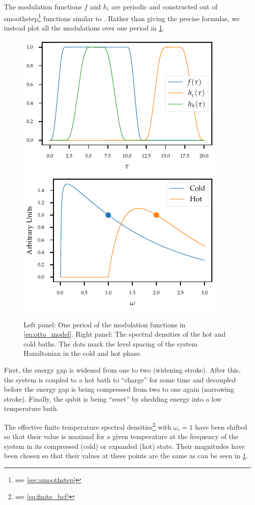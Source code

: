 The modulation functions \(f\) and \(h_{i}\) are periodic and
constructed out of smoothstep\footnote{see \cref{sec:smoothstep}}
functions similar to \cite{Wiedmann2021Jun}.  Rather than giving the precise formulas, we instead plot
all the modulations over one period in \cref{fig:ottomod}.
\begin{figure}[htp]
  \centering
  \includegraphics{figs/otto/modulation}
  \includegraphics{figs/otto/spectral_densities}
  \caption{\label{fig:ottomod} Left panel: One period of the modulation functions
    in \cref{eq:otto_model}. Right panel: The spectral densities of
    the hot and cold baths. The dots mark the level spacing of the
    system Hamiltonian in the cold and hot phase.}
\end{figure}

First, the energy gap is widened from one to two (widening
stroke). After this, the system is coupled to a hot bath to ``charge''
for some time and decoupled before the energy gap is being compressed
from two to one again (narrowing stroke). Finally, the qubit is being
``reset'' by shedding energy into a low temperature bath.

The effective finite temperature spectral
densities\footnote{see \cref{eq:finite_bcf}} with \(ω_{c}=1\) have
been shifted so that their value is maximal for a given temperature
at the frequency of the system in its compressed (cold) or expanded
(hot) state. Their magnitudes have been chosen so that their values at
these points are the same as can be seen in \cref{fig:ottomod}.

